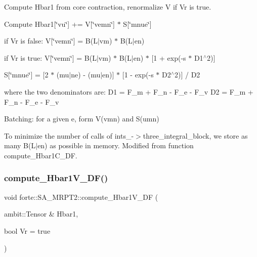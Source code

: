 Compute Hbar1 from core contraction, renormalize V if Vr is true. 

Compute Hbar1\mbox{[}\char`\"{}vu\char`\"{}\mbox{]} += V\mbox{[}\char`\"{}vemn\char`\"{}\mbox{]} $\ast$ S\mbox{[}\char`\"{}mnue\char`\"{}\mbox{]}


\begin{DoxyItemize}
\item if Vr is false\+: V\mbox{[}\char`\"{}vemn\char`\"{}\mbox{]} = B(L$\vert$vm) $\ast$ B(L$\vert$en)
\item if Vr is true\+: V\mbox{[}\char`\"{}vemn\char`\"{}\mbox{]} = B(L$\vert$vm) $\ast$ B(L$\vert$en) $\ast$ \mbox{[}1 + exp(-\/s $\ast$ D1$^\wedge$2)\mbox{]}
\item S\mbox{[}\char`\"{}mnue\char`\"{}\mbox{]} = \mbox{[}2 $\ast$ (mu$\vert$ne) -\/ (mu$\vert$en)\mbox{]} $\ast$ \mbox{[}1 -\/ exp(-\/s $\ast$ D2$^\wedge$2)\mbox{]} / D2
\end{DoxyItemize}

where the two denominators are\+: D1 = F\+\_\+m + F\+\_\+n -\/ F\+\_\+e -\/ F\+\_\+v D2 = F\+\_\+m + F\+\_\+n -\/ F\+\_\+e -\/ F\+\_\+v

Batching\+: for a given e, form V(vmn) and S(umn)

To minimize the number of calls of ints\+\_\+-\/$>$three\+\_\+integral\+\_\+block, we store as many B(L$\vert$en) as possible in memory. Modified from function compute\+\_\+\+Hbar1\+C\+\_\+\+DF.\mbox{\label{classforte_1_1_s_a___m_r_p_t2_a0f64bc015ef779f89f4f2c4ae5a52b57}} 
\subsubsection{\texorpdfstring{compute\+\_\+\+Hbar1\+V\+\_\+\+D\+F()}{compute\_Hbar1V\_DF()}}
{\footnotesize\ttfamily void forte\+::\+S\+A\+\_\+\+M\+R\+P\+T2\+::compute\+\_\+\+Hbar1\+V\+\_\+\+DF (\begin{DoxyParamCaption}\item[{ambit\+::\+Tensor \&}]{Hbar1,  }\item[{bool}]{Vr = {\ttfamily true} }\end{DoxyParamCaption})\hspace{0.3cm}{\ttfamily [protected]}}



